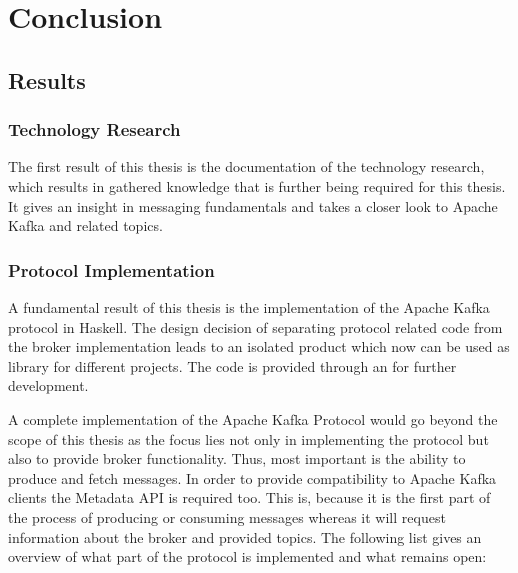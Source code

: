 \chapter{Conclusion}
\section{Results}
\label{sec:conc-results}
\subsection{Technology Research}
The first result of this thesis is the documentation of the technology research,
which results in gathered knowledge that is further being required for this
thesis.  It gives an insight in messaging fundamentals and  takes a closer look
to Apache Kafka and related topics.

\subsection{Protocol Implementation}

A fundamental result of this thesis is the implementation of the Apache Kafka
protocol in Haskell. The design decision of separating protocol related code
from the broker implementation leads to an isolated product which now can be used
as library for different projects. The code is provided through an  for further development.

A complete implementation of the Apache Kafka Protocol would go beyond the scope
of this thesis as the focus lies not only in implementing the protocol but also
to provide broker functionality. Thus, most important is the ability to produce
and fetch messages. In order to provide compatibility to Apache Kafka clients
the Metadata API is required too. This is, because it is the first part of the
process of producing or consuming messages whereas it will request information
about the broker and provided topics. The following list gives an overview of
what part of the protocol is implemented and what remains open:

